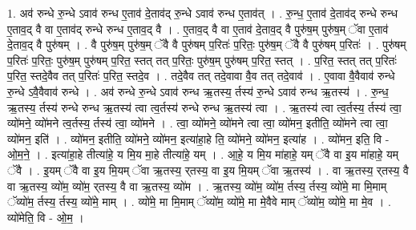 \documentclass[17pt]{extarticle}
\begin{document}
1. अव॑ रुन्धे रु॒न्धे ऽवाव॑ रुन्ध ए॒ताव॑ दे॒ताव॑द् रु॒न्धे ऽवाव॑ रुन्ध ए॒ताव॑त् । . रु॒न्ध॒ ए॒ताव॑ दे॒ताव॑द् रुन्धे रुन्ध ए॒ताव॒द् वै वा ए॒ताव॑द् रुन्धे रुन्ध ए॒ताव॒द् वै । . ए॒ताव॒द् वै वा ए॒ताव॑ दे॒ताव॒द् वै पुरु॑ष॒म् पुरु॑ष॒म् ॅवा ए॒ताव॑ दे॒ताव॒द् वै पुरु॑षम् । . वै पुरु॑ष॒म् पुरु॑ष॒म् ॅवै वै पुरु॑षम् प॒रितः॑ प॒रितः॒ पुरु॑ष॒म् ॅवै वै पुरु॑षम् प॒रितः॑ । . पुरु॑षम् प॒रितः॑ प॒रितः॒ पुरु॑ष॒म् पुरु॑षम् प॒रित॒ स्तत् तत् प॒रितः॒ पुरु॑ष॒म् पुरु॑षम् प॒रित॒ स्तत् । . प॒रित॒ स्तत् तत् प॒रितः॑ प॒रित॒ स्तदे॒वैव तत् प॒रितः॑ प॒रित॒ स्तदे॒व । . तदे॒वैव तत् तदे॒वावा वै॒व तत् तदे॒वाव॑ । . ए॒वावा वै॒वैवाव॑ रुन्धे रु॒न्धे ऽवै॒वैवाव॑ रुन्धे । . अव॑ रुन्धे रु॒न्धे ऽवाव॑ रुन्ध ऋ॒तस्य॒ र्तस्य॑ रु॒न्धे ऽवाव॑ रुन्ध ऋ॒तस्य॑ । . रु॒न्ध॒ ऋ॒तस्य॒ र्तस्य॑ रुन्धे रुन्ध ऋ॒तस्य॑ त्वा त्व॒र्तस्य॑ रुन्धे रुन्ध ऋ॒तस्य॑ त्वा । . ऋ॒तस्य॑ त्वा त्व॒र्तस्य॒ र्तस्य॑ त्वा॒ व्यो॑मने॒ व्यो॑मने त्व॒र्तस्य॒ र्तस्य॑ त्वा॒ व्यो॑मने । . त्वा॒ व्यो॑मने॒ व्यो॑मने त्वा त्वा॒ व्यो॑मन॒ इतीति॒ व्यो॑मने त्वा त्वा॒ व्यो॑मन॒ इति॑ । . व्यो॑मन॒ इतीति॒ व्यो॑मने॒ व्यो॑मन॒ इत्या॑हा॒हे ति॒ व्यो॑मने॒ व्यो॑मन॒ इत्या॑ह । . व्यो॑मन॒ इति॒ वि - ओ॒म॒ने॒ । . इत्या॑हा॒हे तीत्या॑हे॒ य मि॒य मा॒हे तीत्या॑हे॒ यम् । . आ॒हे॒ य मि॒य मा॑हाहे॒ यम् ॅवै वा इ॒य मा॑हाहे॒ यम् ॅवै । . इ॒यम् ॅवै वा इ॒य मि॒यम् ॅवा ऋ॒तस्य॒ र्‌तस्य॒ वा इ॒य मि॒यम् ॅवा ऋ॒तस्य॑ । . वा ऋ॒तस्य॒ र्‌तस्य॒ वै वा ऋ॒तस्य॒ व्यो॑म॒ व्यो॑म॒ र्‌तस्य॒ वै वा ऋ॒तस्य॒ व्यो॑म । . ऋ॒तस्य॒ व्यो॑म॒ व्यो॑म॒ र्तस्य॒ र्तस्य॒ व्यो॑मे॒ मा मि॒माम् ॅव्यो॑म॒ र्तस्य॒ र्तस्य॒ व्यो॑मे॒ माम् । . व्यो॑मे॒ मा मि॒माम् ॅव्यो॑म॒ व्यो॑मे॒ मा मे॒वैवे माम् ॅव्यो॑म॒ व्यो॑मे॒ मा मे॒व । . व्यो॑मेति॒ वि - ओ॒म॒ । \newline
\end{document}

